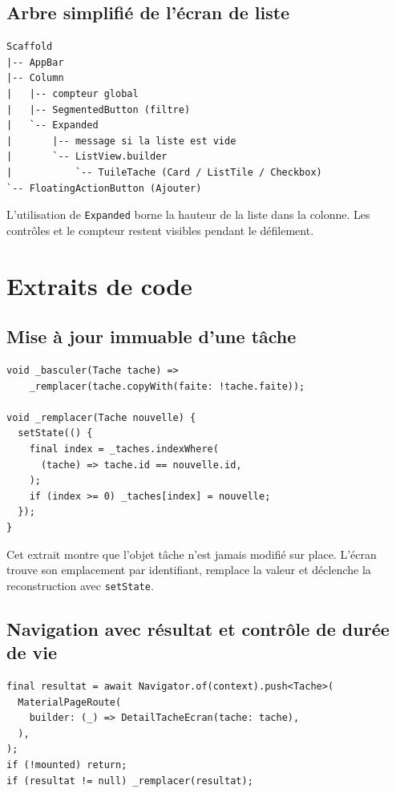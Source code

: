\documentclass[12pt,a4paper]{report}
\begin{document}
\section{Arbre simplifié de l’écran de liste}

\begin{lstlisting}[basicstyle=\ttfamily\small,frame=single]
Scaffold
|-- AppBar
|-- Column
|   |-- compteur global
|   |-- SegmentedButton (filtre)
|   `-- Expanded
|       |-- message si la liste est vide
|       `-- ListView.builder
|           `-- TuileTache (Card / ListTile / Checkbox)
`-- FloatingActionButton (Ajouter)
\end{lstlisting}

L’utilisation de \texttt{Expanded} borne la hauteur de la liste dans la colonne. Les contrôles et le compteur restent visibles pendant le défilement.

\chapter{Extraits de code}

\section{Mise à jour immuable d’une tâche}

\begin{lstlisting}
void _basculer(Tache tache) =>
    _remplacer(tache.copyWith(faite: !tache.faite));

void _remplacer(Tache nouvelle) {
  setState(() {
    final index = _taches.indexWhere(
      (tache) => tache.id == nouvelle.id,
    );
    if (index >= 0) _taches[index] = nouvelle;
  });
}
\end{lstlisting}

Cet extrait montre que l’objet tâche n’est jamais modifié sur place. L’écran trouve son emplacement par identifiant, remplace la valeur et déclenche la reconstruction avec \texttt{setState}.

\section{Navigation avec résultat et contrôle de durée de vie}

\begin{lstlisting}
final resultat = await Navigator.of(context).push<Tache>(
  MaterialPageRoute(
    builder: (_) => DetailTacheEcran(tache: tache),
  ),
);
if (!mounted) return;
if (resultat != null) _remplacer(resultat);
\end{lstlisting}
\end{document}
